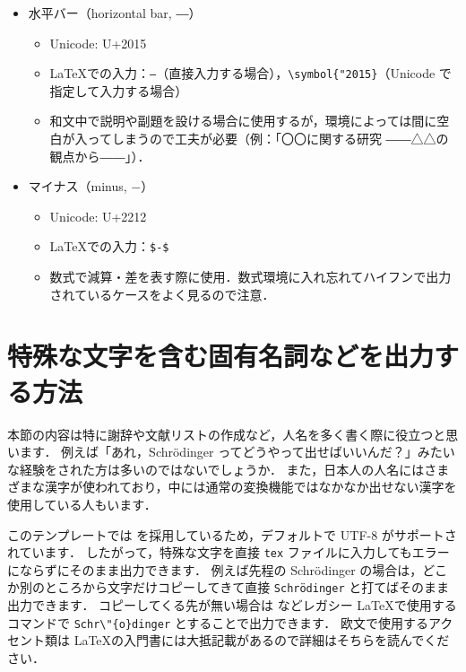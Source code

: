 \begin{itemize}
\begin{itemize}
    \end{itemize}
    \item 水平バー（horizontal bar, ―）
    \begin{itemize}
        \item Unicode: U+2015
        \item \LaTeX での入力：\verb|―|（直接入力する場合），\verb|\symbol{"2015}|（Unicode で指定して入力する場合）
        \item 和文中で説明や副題を設ける場合に使用するが，環境によっては間に空白が入ってしまうので工夫が必要（例：「〇〇に関する研究 ――△△の観点から――」）．
    \end{itemize}
    \item マイナス（minus, $-$）
    \begin{itemize}
        \item Unicode: U+2212
        \item \LaTeX での入力：\verb|$-$|
        \item 数式で減算・差を表す際に使用．数式環境に入れ忘れてハイフンで出力されているケースをよく見るので注意．
    \end{itemize}
\end{itemize}

\section{特殊な文字を含む固有名詞などを出力する方法}
\label{sec:unicode}

本節の内容は特に謝辞や文献リストの作成など，人名を多く書く際に役立つと思います．
例えば「あれ，Schrödinger ってどうやって出せばいいんだ？」みたいな経験をされた方は多いのではないでしょうか．
また，日本人の人名にはさまざまな漢字が使われており，中には通常の変換機能ではなかなか出せない漢字を使用している人もいます．

このテンプレートでは \LuaLaTeX を採用しているため，デフォルトで UTF-8 がサポートされています．
したがって，特殊な文字を直接 \verb|tex| ファイルに入力してもエラーにならずにそのまま出力できます．
例えば先程の Schrödinger の場合は，どこか別のところから文字だけコピーしてきて直接 \verb|Schrödinger| と打てばそのまま出力できます．
コピーしてくる先が無い場合は \pLaTeX などレガシー \LaTeX で使用するコマンドで \verb|Schr\"{o}dinger| とすることで出力できます．
欧文で使用するアクセント類は \LaTeX の入門書には大抵記載があるので詳細はそちらを読んでください．

